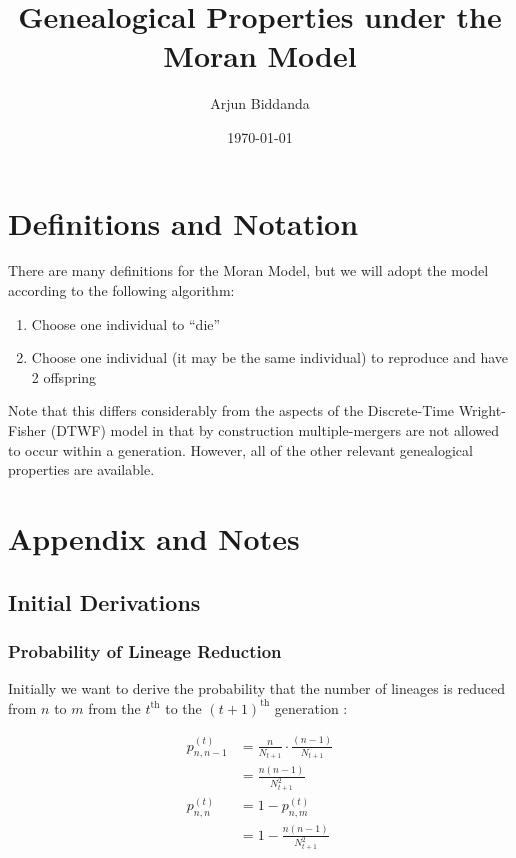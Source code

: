 \documentclass[10pt]{article}
\title{Genealogical Properties under the Moran Model}\author{Arjun Biddanda}
\date{\today}
\begin{document}
\maketitle

\section{Definitions and Notation}

There are many definitions for the Moran Model, but we will adopt the model according to the following algorithm:

\begin{enumerate}
	\item Choose one individual to ``die''
	\item Choose one individual (it may be the same individual) to reproduce and have 2 offspring
\end{enumerate}

Note that this differs considerably from the aspects of the Discrete-Time Wright-Fisher (DTWF) model in that by construction multiple-mergers are not allowed to occur within a generation. However, all of the other relevant genealogical properties are available.

\section{Appendix and Notes}

\subsection{Initial Derivations}

\subsubsection{Probability of Lineage Reduction}
Initially we want to derive the probability that the number of lineages is reduced from $n$ to $m$ from the $t^{\text{th}}$ to the $(t+1)^{\text{th}}$ generation :

$$
\begin{aligned}
	p^{(t)}_{n,n-1} &= \frac{n}{N_{t+1}}\cdot \frac{(n-1)}{N_{t+1}}\\
	&= \frac{n(n-1)}{N^2_{t+1}}\\
	p^{(t)}_{n,n} &= 1 - p^{(t)}_{n,m}\\
	&= 1 - \frac{n(n-1)}{N^2_{t+1}}\\
\end{aligned}
$$
\end{document}

